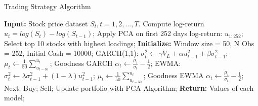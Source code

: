 \documentclass[11pt,a4paper]{article}
\begin{document}
    \begin{algorithm}[H]
        \caption{Trading Strategy Algorithm}
        \begin{algorithmic}[1]
        \State \textbf{Input:} Stock price dataset $S_{t}, t = 1, 2, ..., T$.
        \State Compute log-return $u_{t} = log(S_{t})-log(S_{t-1})$;
        \State Apply PCA on first 252 days log-return: $u_{1:252}$;
        \State Select top 10 stocks with highest loadings;
        \State \textbf{Initialize:} Window size = 50, N Obs = 252, Initial Cash = 10000;
        \State GARCH(1,1):
        \State $\sigma_{t}^{2} \gets \gamma V_{L}+\alpha u_{t-1}^{2} + \beta \sigma_{t-1}^{2}$;
        \State $\mu_{t} \gets \frac{1}{50}\sum_{u_{t-50}}^{u_{t}}$;
        \State Goodness GARCH $\alpha_{t} \gets \frac{\mu_{t}}{\sigma_{t}} - \frac{1}{2}$;
        \State EWMA:
        \State $\sigma_{t}^{2} \gets \lambda \sigma_{t-1}^{2}+(1-\lambda)u_{t-1}^{2}$;
        \State $\mu_{t} \gets \frac{1}{50}\sum_{u_{t-50}}^{u_{t}}$;
        \State Goodness EWMA $\alpha_{t} \gets \frac{\mu_{t}}{\sigma_{t}} - \frac{1}{2}$;
        \State Next;
        \EndIf
        \State Buy;
        \State Sell;
        \State Update portfolio with PCA Algorithm;
        \EndIf
        \EndFor
        \State \textbf{Return:} Values of each model;
        \end{algorithmic}
    \end{algorithm}
    
    
\end{document}
